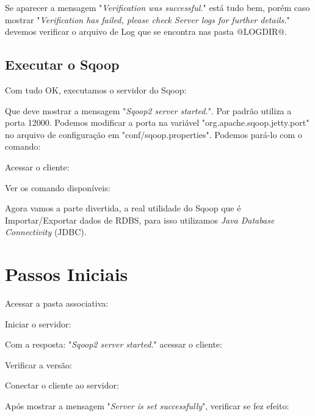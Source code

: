 \documentclass[a4paper,11pt]{article}
\begin{document}
Se aparecer a mensagem "\textit{Verification was successful.}" está tudo bem, porém caso mostrar "\textit{Verification has failed, please check Server logs for further details.}" devemos verificar o arquivo de Log que se encontra nas pasta @LOGDIR@.

\subsection{Executar o Sqoop}
Com tudo OK, executamos o servidor do Sqoop: \\

Que deve mostrar a mensagem "\textit{Sqoop2 server started.}". Por padrão utiliza a porta 12000. Podemos modificar a porta na variável "org.apache.sqoop.jetty.port" no arquivo de configuração em "conf/sqoop.properties". Podemos pará-lo com o comando: \\

Acessar o cliente: \\

Ver os comando disponíveis: \\

Agora vamos a parte divertida, a real utilidade do Sqoop que é Importar/Exportar dados de RDBS, para isso utilizamos \textit{Java Database Connectivity} (JDBC).

\section{Passos Iniciais}
Acessar a pasta associativa: \\

Iniciar o servidor: \\

Com a resposta: "\textit{Sqoop2 server started.}" acessar o cliente: \\

Verificar a versão: \\

Conectar o cliente ao servidor: \\

Após mostrar a mensagem "\textit{Server is set successfully}", verificar se fez efeito: \\
\end{document}
